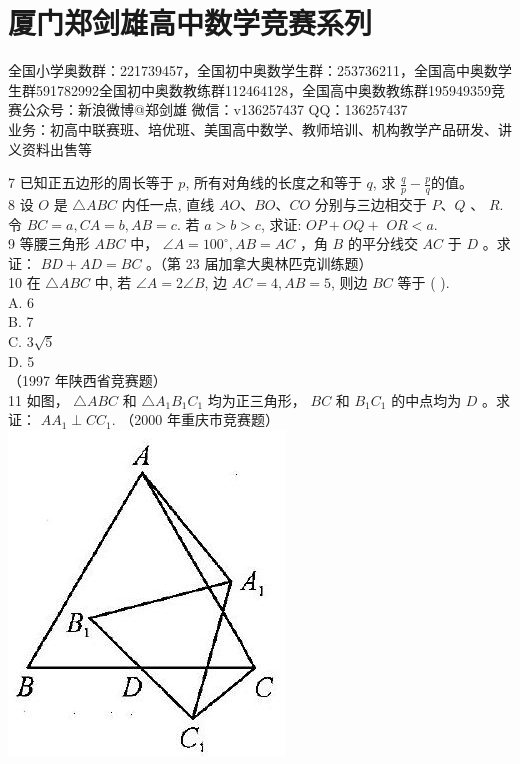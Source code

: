 \documentclass[10pt]{article}
\begin{document}
\section*{厦门郑剑雄高中数学竞赛系列}
全国小学奥数群：221739457，全国初中奥数学生群：253736211，全国高中奥数学生群591782992全国初中奥数教练群112464128，全国高中奥数教练群195949359竞赛公众号：新浪微博@郑剑雄 微信：v136257437 QQ：136257437\\
业务：初高中联赛班、培优班、美国高中数学、教师培训、机构教学产品研发、讲义资料出售等

7 已知正五边形的周长等于 $p$, 所有对角线的长度之和等于 $q$, 求 $\frac{q}{p}-\frac{p}{q}$的值。\\
8 设 $O$ 是 $\triangle A B C$ 内任一点, 直线 $A O 、 B O 、 C O$ 分别与三边相交于 $P 、 Q$ 、 $R$. 令 $B C=a, C A=b, A B=c$. 若 $a>b>c$, 求证: $O P+O Q+$ $O R<a$.\\
9 等腰三角形 $A B C$ 中， $\angle A=100^{\circ}, A B=A C$ ，角 $B$ 的平分线交 $A C$ 于 $D$ 。求证： $B D+A D=B C$ 。（第 23 届加拿大奥林匹克训练题）\\
10 在 $\triangle A B C$ 中, 若 $\angle A=2 \angle B$, 边 $A C=4, A B=5$, 则边 $B C$ 等于 ( ).\\
A. 6\\
B. 7\\
C. $3 \sqrt{5}$\\
D. 5\\
（1997 年陕西省竞赛题）\\
11 如图， $\triangle A B C$ 和 $\triangle A_{1} B_{1} C_{1}$ 均为正三角形， $B C$ 和 $B_{1} C_{1}$ 的中点均为 $D$ 。求证： $A A_{1} \perp C C_{1}$. （2000 年重庆市竞赛题）\\
\includegraphics[max width=\textwidth, center]{2024_10_30_2c8f45efd4a519b08e1ag-044(1)}\\
\end{document}
